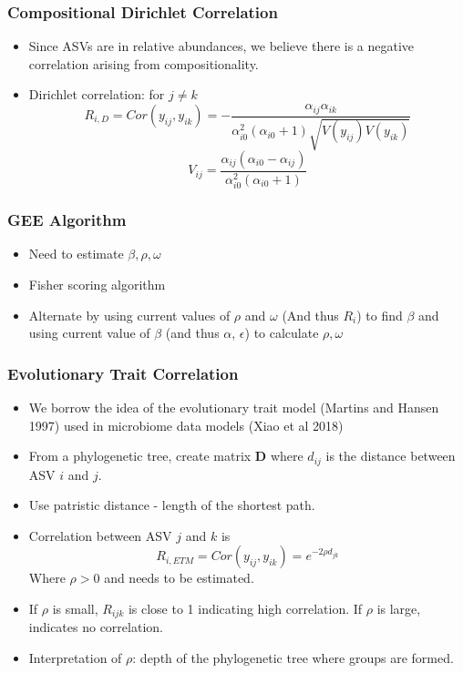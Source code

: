 \documentclass{beamer}
\begin{document}
\begin{frame}
\frametitle{Compositional Dirichlet Correlation}
\begin{itemize}
  \item Since ASVs are in relative abundances, we believe there is a negative correlation arising from compositionality.
  \item Dirichlet correlation:
  for $j \neq k$
  \[ R_{i,D} = Cor(y_{ij}, y_{ik})  = - \frac{\alpha_{ij}\alpha_{ik}}{\alpha_{i0}^2(\alpha_{i0} + 1)\sqrt{V(y_{ij})V(y_{ik})}} \]
  \[ V_{ij} = \frac{\alpha_{ij}(\alpha_{i0} - \alpha_{ij})}{\alpha_{i0}^2(\alpha_{i0} + 1)} \]
\end{itemize}
\end{frame}
\begin{frame}
\frametitle{GEE Algorithm}
\begin{itemize}
  \item Need to estimate $\beta, \rho, \omega$
  \item Fisher scoring algorithm
  \item Alternate by using current values of $\rho $ and $\omega$ (And thus $R_i$) to find $\beta$ and using current value of $\beta$ (and thus $\alpha$, $\epsilon$) to calculate $\rho, \omega$
\end{itemize}
\end{frame}


\begin{frame}
\frametitle{Evolutionary Trait Correlation}
\begin{itemize}
  \item We borrow the idea of the evolutionary trait model (Martins and Hansen 1997) used in microbiome data models (Xiao et al 2018)
  \item From a phylogenetic tree, create matrix $\mathbf{D}$ where $d_{ij}$ is the distance between ASV $i$ and $j$.
  \item Use patristic distance - length of the shortest path.
  \item Correlation between ASV $j$ and $k$ is
  $$R_{i,ETM} = Cor(y_{ij}, y_{ik})  = e^{-2\rho d_{jk}}$$ Where $\rho > 0$ and needs to be estimated.
\item If $\rho$ is small, $R_{ijk}$ is close to 1 indicating high correlation. If $\rho$ is large, indicates no correlation.
  \item Interpretation of $\rho$: depth of the phylogenetic tree where groups are formed.
\end{itemize}
\end{frame}
\end{document}
